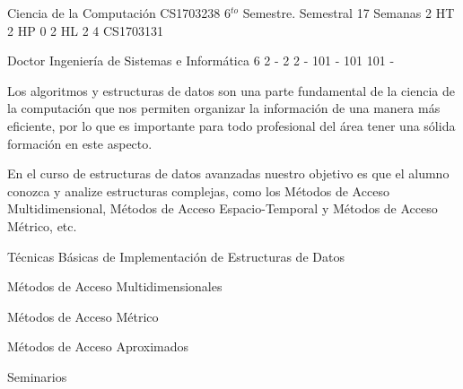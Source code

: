 \documentclass[a4paper,8pt]{article}
\begin{document}
\setNombreProfesor{}
\setGradoProfesorAbreviado{}
\sylabusHeader

\academicaTable
{Ciencia de la Computación} %
{CS1703238} %
{6$^{to}$ Semestre.} %
{Semestral} %
{17 Semanas} %
{2 HT} %
{2 HP} %
{0} %
{2 HL}  %
{2} %
{4} %
{CS1703131} %

\administrativaTable
{Doctor} %
{Ingeniería de Sistemas e Informática} %
{6} %
{2} %
{-} %
{2} %
{2} %
{-} %
{101} %
{-} %
{101} %
{101} %
{-} %


\begin{fundamentacion}
Los algoritmos y estructuras de datos son una parte fundamental de la ciencia de la computación que nos 
permiten organizar la información de una manera más eficiente, por lo que es importante para todo 
profesional del área tener una sólida formación en este aspecto.

En el curso de estructuras de datos avanzadas nuestro objetivo es que el alumno conozca y analize 
estructuras complejas, como los Métodos de Acceso Multidimensional, 
Métodos de Acceso Espacio-Temporal y Métodos de Acceso Métrico, etc.

\end{fundamentacion}

\begin{sumilla}
\item Técnicas Básicas de Implementación de Estructuras de Datos
\item Métodos de Acceso Multidimensionales
\item Métodos de Acceso Métrico
\item Métodos de Acceso Aproximados
\item Seminarios

\end{sumilla}

\begin{competenciasAsignatura}
\item {}
\item {}
\item {}

\end{competenciasAsignatura}
\end{document}
